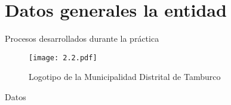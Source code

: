 \section*{Datos generales la entidad}

\begin{frame}{Procesos desarrollados durante la práctica}
	\begin{minipage}{0.35\textwidth}
		\begin{figure}[h!]
			\captionsetup{width=\textwidth}
			\centering
			\texttt{[image: 2.2.pdf]}
			\caption[Logotipo de la Municipalidad Distrital de Tamburco]{Logotipo de la Municipalidad Distrital de Tamburco}
			\label{fig:mdt-1}
		\end{figure}
	\end{minipage}
	\quad
	\begin{minipage}{0.55\textwidth}
		\begin{block}{Datos}
			\begin{table}[H]
				\centering
				\label{tab:addlabel}%
			\end{table}%
		\end{block}
	\end{minipage}
\end{frame}
